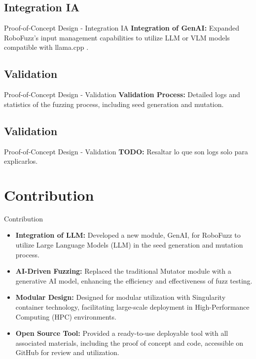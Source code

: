 \documentclass[aspectratio=169]{beamer}
\begin{document}
    
\subsection{Integration IA}
\begin{frame}{Proof-of-Concept Design - Integration IA}
 \textbf{Integration of GenAI:} Expanded RoboFuzz's input management capabilities to utilize LLM or VLM models compatible with llama.cpp  .
  
\end{frame}

\subsection{Validation}
\begin{frame}{Proof-of-Concept Design - Validation}
 \textbf{Validation Process:} Detailed logs and statistics of the fuzzing process, including seed generation and mutation.
% 

\end{frame}

\subsection{Validation}
\begin{frame}{Proof-of-Concept Design - Validation}
 \textbf{TODO:} Resaltar lo que son logs solo para explicarlos.
% 
%
\end{frame}


\section{Contribution}
\begin{frame}{Contribution}
\begin{tcolorbox}[drop shadow southeast, enhanced, colback=blue!5!white, colframe=Azuloscuro-cisis]
\begin{itemize}
    \item \textbf{Integration of LLM:} Developed a new module, GenAI, for RoboFuzz to utilize Large Language Models (LLM) in the seed generation and mutation process.
    \item \textbf{AI-Driven Fuzzing:} Replaced the traditional Mutator module with a generative AI model, enhancing the efficiency and effectiveness of fuzz testing.
    \item \textbf{Modular Design:} Designed for modular utilization with Singularity container technology, facilitating large-scale deployment in High-Performance Computing (HPC) environments.
    \item \textbf{Open Source Tool:} Provided a ready-to-use deployable tool with all associated materials, including the proof of concept and code, accessible on GitHub for review and utilization.
\end{itemize}
\end{tcolorbox}
\end{frame}
\end{document}
